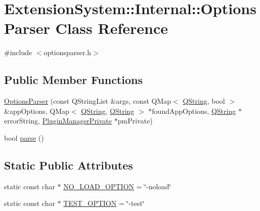\hypertarget{class_extension_system_1_1_internal_1_1_options_parser}{\section{Extension\-System\-:\-:Internal\-:\-:Options\-Parser Class Reference}
\label{class_extension_system_1_1_internal_1_1_options_parser}
}


{\ttfamily \#include $<$optionsparser.\-h$>$}

\subsection*{Public Member Functions}
\begin{DoxyCompactItemize}
\item 
\hyperlink{class_extension_system_1_1_internal_1_1_options_parser_acf0ee2e8b5fef5233c8b2f35a588f761}{Options\-Parser} (const Q\-String\-List \&args, const Q\-Map$<$ \hyperlink{group___u_a_v_objects_plugin_gab9d252f49c333c94a72f97ce3105a32d}{Q\-String}, bool $>$ \&app\-Options, Q\-Map$<$ \hyperlink{group___u_a_v_objects_plugin_gab9d252f49c333c94a72f97ce3105a32d}{Q\-String}, \hyperlink{group___u_a_v_objects_plugin_gab9d252f49c333c94a72f97ce3105a32d}{Q\-String} $>$ $\ast$found\-App\-Options, \hyperlink{group___u_a_v_objects_plugin_gab9d252f49c333c94a72f97ce3105a32d}{Q\-String} $\ast$error\-String, \hyperlink{class_extension_system_1_1_internal_1_1_plugin_manager_private}{Plugin\-Manager\-Private} $\ast$pm\-Private)
\item 
bool \hyperlink{class_extension_system_1_1_internal_1_1_options_parser_a9e2daeafd44e4d07e6b38a0629a47bd5}{parse} ()
\end{DoxyCompactItemize}
\subsection*{Static Public Attributes}
\begin{DoxyCompactItemize}
\item 
static const char $\ast$ \hyperlink{class_extension_system_1_1_internal_1_1_options_parser_a4750d20fa380d4217b6247d0953ea975}{N\-O\-\_\-\-L\-O\-A\-D\-\_\-\-O\-P\-T\-I\-O\-N} = \char`\"{}-\/noload\char`\"{}
\item 
static const char $\ast$ \hyperlink{class_extension_system_1_1_internal_1_1_options_parser_a0fa18d9e88d365b1a49705ed70e87a90}{T\-E\-S\-T\-\_\-\-O\-P\-T\-I\-O\-N} = \char`\"{}-\/test\char`\"{}
\end{DoxyCompactItemize}


